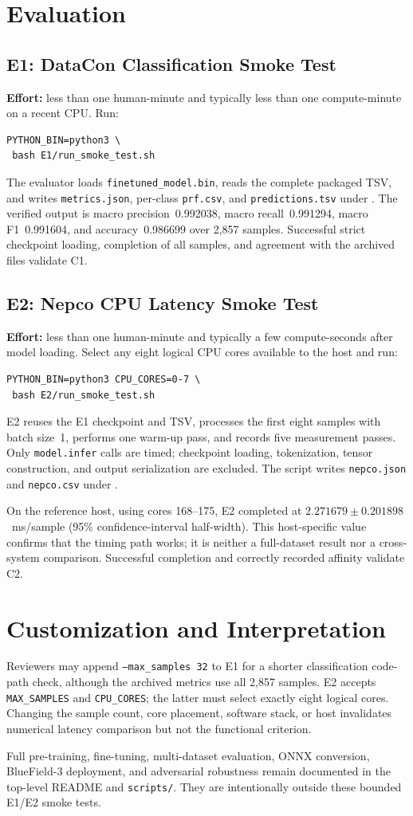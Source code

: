 \documentclass[10pt,letterpaper,twocolumn]{article}
\begin{document}
\section{Evaluation}
\subsection{E1: DataCon Classification Smoke Test}
\textbf{Effort:} less than one human-minute and typically less than one compute-minute on a recent CPU. Run:
\begin{verbatim}
PYTHON_BIN=python3 \
 bash E1/run_smoke_test.sh
\end{verbatim}
The evaluator loads \texttt{finetuned\_model.bin}, reads the complete packaged TSV, and writes \texttt{metrics.json}, per-class \texttt{prf.csv}, and \texttt{predictions.tsv} under . The verified output is macro precision~0.992038, macro recall~0.991294, macro F1~0.991604, and accuracy~0.986699 over 2,857 samples. Successful strict checkpoint loading, completion of all samples, and agreement with the archived files validate C1.

\subsection{E2: Nepco CPU Latency Smoke Test}
\textbf{Effort:} less than one human-minute and typically a few compute-seconds after model loading. Select any eight logical CPU cores available to the host and run:
\begin{verbatim}
PYTHON_BIN=python3 CPU_CORES=0-7 \
 bash E2/run_smoke_test.sh
\end{verbatim}
E2 reuses the E1 checkpoint and TSV, processes the first eight samples with batch size~1, performs one warm-up pass, and records five measurement passes. Only \texttt{model.infer} calls are timed; checkpoint loading, tokenization, tensor construction, and output serialization are excluded. The script writes \texttt{nepco.json} and \texttt{nepco.csv} under .

On the reference host, using cores 168--175, E2 completed at $2.271679 \pm 0.201898$~ms/sample (95\% confidence-interval half-width). This host-specific value confirms that the timing path works; it is neither a full-dataset result nor a cross-system comparison. Successful completion and correctly recorded affinity validate C2.

\section{Customization and Interpretation}
Reviewers may append \texttt{--max\_samples 32} to E1 for a shorter classification code-path check, although the archived metrics use all 2,857 samples. E2 accepts \texttt{MAX\_SAMPLES} and \texttt{CPU\_CORES}; the latter must select exactly eight logical cores. Changing the sample count, core placement, software stack, or host invalidates numerical latency comparison but not the functional criterion.

Full pre-training, fine-tuning, multi-dataset evaluation, ONNX conversion, BlueField-3 deployment, and adversarial robustness remain documented in the top-level README and \texttt{scripts/}. They are intentionally outside these bounded E1/E2 smoke tests.
\end{document}
